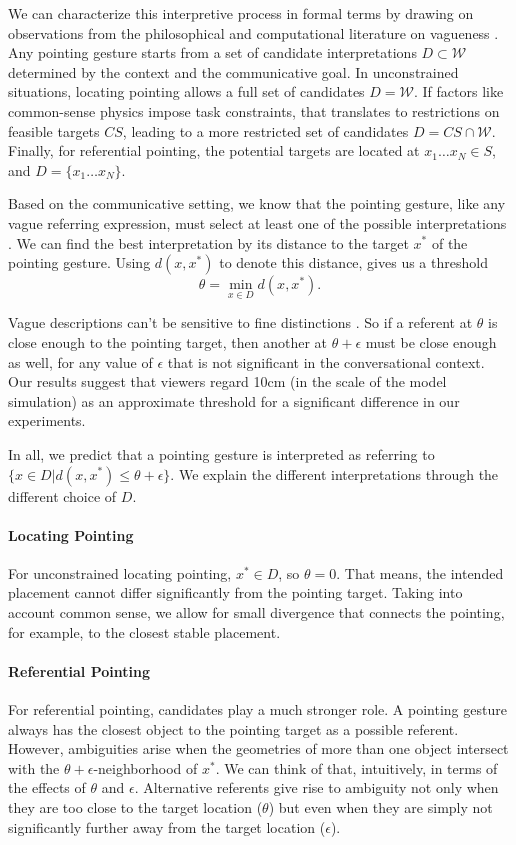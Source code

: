 \documentclass[letterpaper]{article} %
\begin{document}
We can characterize this interpretive process in formal terms by drawing on observations from the philosophical and computational literature on vagueness \cite{devault2004interpreting,graff2000shifting,kyburg2000fitting}.  Any pointing gesture starts from a set of candidate interpretations $D \subset \mathcal{W}$ determined by the context and the communicative goal.  In unconstrained situations, locating pointing allows a full set of candidates $D = \mathcal{W}.$  If factors like common-sense physics impose task constraints, that translates to restrictions on feasible targets $CS$, leading to a more restricted set of candidates $D = CS \cap \mathcal{W}$.  Finally, for referential pointing, the potential targets are located at $x_1 \ldots x_N \in S$, and $D = \{ x_1 \ldots x_N \}.$

Based on the communicative setting, we know that the pointing gesture, like any vague referring expression, must select at least one of the possible interpretations \cite{kyburg2000fitting}.  We can find the best interpretation by its distance to the target $x^*$ of the pointing gesture.  Using $d(x,x^*)$ to denote this distance, gives us a threshold $$\theta = \min_{x \in D} d(x, x^*).$$

Vague descriptions can't be sensitive to fine distinctions \cite{graff2000shifting}.  So if a referent at $\theta$ is close enough to the pointing target, then another at $\theta + \epsilon$ must be close enough as well, for any value of $\epsilon$ that is not significant in the conversational context. Our results suggest that viewers regard 10cm (in the scale of the model simulation) as an approximate threshold for a significant difference in our experiments.

In all, we predict that a pointing gesture is interpreted as referring to $\{x \in D | d(x,x^*) \leq \theta + \epsilon\}.$  We explain the different interpretations through the different choice of $D$.

\paragraph{Locating Pointing}  For unconstrained locating pointing, $x^* \in D$, so $\theta=0$.  That means, the intended placement cannot differ significantly from the pointing target.  Taking into account common sense, we allow for small divergence that connects the pointing, for example, to the closest stable placement.

\paragraph{Referential Pointing}  For referential pointing, candidates play a much stronger role.  A pointing gesture always has the closest object to the pointing target as a possible referent.  However, ambiguities arise when the geometries of more than one object intersect with the $\theta+\epsilon$-neighborhood of $x^*$.   We can think of that, intuitively, in terms of the effects of $\theta$ and $\epsilon$.  Alternative referents give rise to ambiguity not only when they are too close to the target location ($\theta$) but even when they are simply not significantly further away from the target location ($\epsilon$).  
\end{document}
